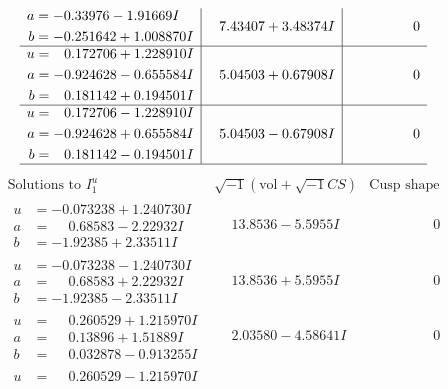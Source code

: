 \documentclass[1p]{elsarticle_modified}
\theoremstyle{definition}
\newcommand{\I}{\sqrt{-1}}
\begin{document}
$$\begin{array}{c|c|c}
\begin{aligned}
a &= -0.33976 - 1.91669 I \\
b &= -0.251642 + 1.008870 I\end{aligned}
 & \phantom{-}7.43407 + 3.48374 I & \phantom{-0.000000 } 0 \\ \hline\begin{aligned}
u &= \phantom{-}0.172706 + 1.228910 I \\
a &= -0.924628 - 0.655584 I \\
b &= \phantom{-}0.181142 + 0.194501 I\end{aligned}
 & \phantom{-}5.04503 + 0.67908 I & \phantom{-0.000000 } 0 \\ \hline\begin{aligned}
u &= \phantom{-}0.172706 - 1.228910 I \\
a &= -0.924628 + 0.655584 I \\
b &= \phantom{-}0.181142 - 0.194501 I\end{aligned}
 & \phantom{-}5.04503 - 0.67908 I & \phantom{-0.000000 } 0\\
 \hline 
 \end{array}$$\newpage$$\begin{array}{c|c|c}  
\text{Solutions to }I^u_{1}& \I (\text{vol} + \sqrt{-1}CS) & \text{Cusp shape}\\
 \hline 
\begin{aligned}
u &= -0.073238 + 1.240730 I \\
a &= \phantom{-}0.68583 - 2.22932 I \\
b &= -1.92385 + 2.33511 I\end{aligned}
 & \phantom{-}13.8536 - 5.5955 I & \phantom{-0.000000 } 0 \\ \hline\begin{aligned}
u &= -0.073238 - 1.240730 I \\
a &= \phantom{-}0.68583 + 2.22932 I \\
b &= -1.92385 - 2.33511 I\end{aligned}
 & \phantom{-}13.8536 + 5.5955 I & \phantom{-0.000000 } 0 \\ \hline\begin{aligned}
u &= \phantom{-}0.260529 + 1.215970 I \\
a &= \phantom{-}0.13896 + 1.51889 I \\
b &= \phantom{-}0.032878 - 0.913255 I\end{aligned}
 & \phantom{-}2.03580 - 4.58641 I & \phantom{-0.000000 } 0 \\ \hline\begin{aligned}
u &= \phantom{-}0.260529 - 1.215970 I \\

\end{aligned}
\end{array}$$
\end{document}
